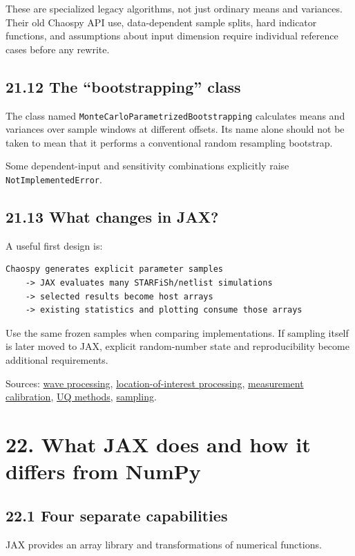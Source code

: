 \documentclass[11pt,a4paper]{article}
\begin{document}
These are specialized legacy algorithms, not just ordinary means and variances. Their old Chaospy API use, data-dependent sample splits, hard indicator functions, and assumptions about input dimension require individual reference cases before any rewrite.

\subsection{21.12 The \textquotedblleft{}bootstrapping\textquotedblright{} class}
The class named \texttt{MonteCarloParametrizedBootstrapping} calculates means and variances over sample windows at different offsets. Its name alone should not be taken to mean that it performs a conventional random resampling bootstrap.

Some dependent-input and sensitivity combinations explicitly raise \texttt{NotImplementedError}.

\subsection{21.13 What changes in JAX?}
A useful first design is:


\begin{lstlisting}
Chaospy generates explicit parameter samples
    -> JAX evaluates many STARFiSh/netlist simulations
    -> selected results become host arrays
    -> existing statistics and plotting consume those arrays
\end{lstlisting}
Use the same frozen samples when comparing implementations. If sampling itself is later moved to JAX, explicit random-number state and reproducibility become additional requirements.

Sources: \href{/home/sadid/starfish/UtilityLib/processing.py}{wave processing}, \href{/home/sadid/starfish/VascularPolynomialChaosLib/classLocationOfInterest.py}{location-of-interest processing}, \href{/home/sadid/starfish/NetworkLib/classMeasurements.py}{measurement calibration}, \href{/home/sadid/starfish/VascularPolynomialChaosLib/classUqsaMethods.py}{UQ methods}, \href{/home/sadid/starfish/VascularPolynomialChaosLib/classSampleManager.py}{sampling}.

\clearpage
\section{22. What JAX does and how it differs from NumPy}
\subsection{22.1 Four separate capabilities}
JAX provides an array library and transformations of numerical functions.
\end{document}
